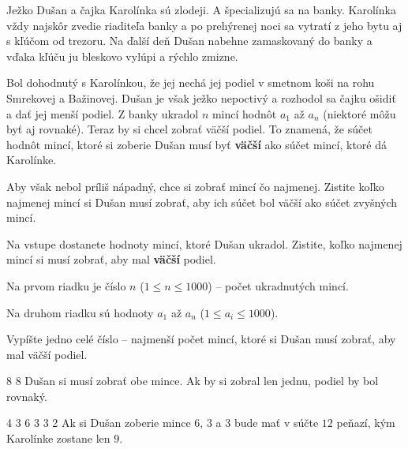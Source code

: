 




Ježko Dušan a čajka Karolínka sú zlodeji. A špecializujú sa na banky. Karolínka vždy najskôr zvedie
riaditeľa banky a po prehýrenej noci sa vytratí z jeho bytu aj s kľúčom od trezoru. Na ďalší deň
Dušan nabehne zamaskovaný do banky a vďaka kľúču ju bleskovo vylúpi a rýchlo zmizne.

Bol dohodnutý s Karolínkou, že jej nechá jej podiel v smetnom koši na rohu Smrekovej a Bažinovej.
Dušan je však ježko nepoctivý a rozhodol sa čajku ošidiť a dať jej menší podiel. Z banky ukradol $n$
mincí hodnôt $a_1$ až $a_n$ (niektoré môžu byť aj rovnaké). Teraz by si chcel zobrať väčší podiel.
To znamená, že súčet hodnôt mincí, ktoré si zoberie Dušan musí byť \textbf{väčší} ako súčet mincí,
ktoré dá Karolínke.

Aby však nebol príliš nápadný, chce si zobrať mincí čo najmenej. Zistite koľko najmenej mincí si
Dušan musí zobrať, aby ich súčet bol väčší ako súčet zvyšných mincí.


Na vstupe dostanete hodnoty mincí, ktoré Dušan ukradol. Zistite, koľko najmenej mincí si musí
zobrať, aby mal \textbf{väčší} podiel.


Na prvom riadku je číslo $n$ ($1 \leq n \leq 1000$) -- počet ukradnutých mincí.

Na druhom riadku sú hodnoty $a_1$ až $a_n$ ($1 \leq a_i \leq 1000$).


Vypíšte jedno celé číslo -- najmenší počet mincí, ktoré si Dušan musí zobrať, aby mal väčší podiel.


8 8
\komentar
Dušan si musí zobrať obe mince. Ak by si zobral len jednu, podiel by bol rovnaký.
\koniec

4 3 6 3 3 2
\komentar
Ak si Dušan zoberie mince $6$, $3$ a $3$ bude mať v súčte $12$ peňazí, kým Karolínke zostane len
$9$.
\koniec


